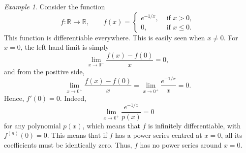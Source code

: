 \documentclass[11pt]{article}
\def\R{\mathbb{R}}
\theoremstyle{definition}
\theoremstyle{remark}
\newtheorem*{example}{Example}
\numberwithin{equation}{module}
\begin{document}
    \begin{example}
        Consider the function \[
            f\colon \R \to \R, \qquad 
            f(x) = \begin{cases}
                e^{- 1 / x}, &\text{ if }x > 0, \\
                0, &\text{ if } x \leq 0.
            \end{cases}
        \] This function is differentiable everywhere. This is easily seen when $x
        \neq 0$. For $x = 0$, the left hand limit is simply \[
            \lim_{x \to 0^-} \frac{f(x) - f(0)}{x} = 0,
        \] and from the positive side, \[
            \lim_{x \to 0^+} \frac{f(x) - f(0)}{x} = \lim_{x \to 0^+}
            \frac{e^{-1 /x}}{x} = 0.
        \] Hence, $f'(0) = 0$. Indeed, \[
            \lim_{x \to 0^+} \frac{e^{-1 /x}}{p(x)} = 0
        \] for any polynomial $p(x)$, which means that $f$ is infinitely
        differentiable, with $f^{(n)}(0) = 0$. This means that if $f$ has a power
        series centred at $x = 0$, all its coefficients must be identically zero.
        Thus, $f$ has no power series around $x = 0$.
    \end{example}
\end{document}

